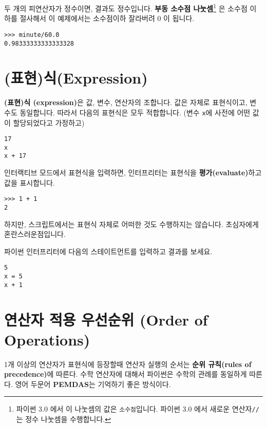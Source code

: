 

두 개의 피연산자가 정수이면, 결과도 정수입니다. {\bf 부동 소수점 나눗셈}\footnote{파이썬 3.0 에서
이 나눗셈의 값은 {\tt 소수점}입니다. 파이썬 3.0 에서  새로운 연산자{\tt //}는 정수 나눗셈을 수행합니다.}
은 소수점 이하를 절사해서 이 예제에서는 소수점이하 잘라버려 0 이 됩니다.

\beforeverb
\begin{verbatim}
>>> minute/60.0
0.98333333333333328
\end{verbatim}
\afterverb

\section{(표현)식(Expression)}
{\bf (표현)식 (expression)}은 값, 변수, 연산자의 조합니다. 값은 자체로 표현식이고, 변수도 동일합니다. 따라서 다음의 표현식은 모두 적합합니다. (변수 {\tt x}에 사전에 어떤 값이 할당되었다고 가정하고)


\beforeverb
\begin{verbatim}
17
x
x + 17
\end{verbatim}
\afterverb
%
인터랙티브 모드에서 표현식을 입력하면, 인터프리터는 표현식을 {\bf 평가(evaluate)}하고 값을 표시합니다.

\beforeverb
\begin{verbatim}
>>> 1 + 1
2
\end{verbatim}
\afterverb
%

하지만, 스크립트에서는 표현식 자체로 어떠한 것도 수행하지는 않습니다. 초심자에게 혼란스러운점입니다.


\begin{ex}

파이썬 인터프리터에 다음의 스테이트먼트를 입력하고 결과를 보세요.

\beforeverb
\begin{verbatim}
5
x = 5
x + 1
\end{verbatim}
\afterverb
%
\end{ex}


\section{연산자 적용 우선순위 (Order of Operations)}

1개 이상의 연산자가 표현식에 등장할때 연산자 실행의 순서는 {\bf  순위 규칙(rules of precedence)}에 따른다. 수학 연산자에 대해서 파이썬은 수학의 관례를 동일하게 따른다. 영어 두문어 {\bf PEMDAS}는 기억하기 좋은 방식이다.


